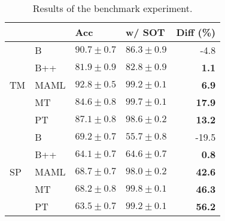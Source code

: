 \begin{table}[h]
\caption{Results of the benchmark experiment.}
\label{tab:tuned-benchmark}
\centering
\begin{tabular}{llllr}
\toprule
 &  & Acc & w/ SOT & Diff (\%) \\
\midrule
\multirow[c]{5}{*}{TM} & B & $90.7 \pm 0.7$ & $86.3 \pm 0.9$ & -4.8 \\
 & B++ & $81.9 \pm 0.9$ & $82.8 \pm 0.9$ & \bfseries 1.1 \\
 & MAML & $92.8 \pm 0.5$ & $99.2 \pm 0.1$ & \bfseries 6.9 \\
 & MT & $84.6 \pm 0.8$ & $99.7 \pm 0.1$ & \bfseries 17.9 \\
 & PT & $87.1 \pm 0.8$ & $98.6 \pm 0.2$ & \bfseries 13.2 \\
\midrule
\multirow[c]{5}{*}{SP} & B & $69.2 \pm 0.7$ & $55.7 \pm 0.8$ & -19.5 \\
 & B++ & $64.1 \pm 0.7$ & $64.6 \pm 0.7$ & \bfseries 0.8 \\
 & MAML & $68.7 \pm 0.7$ & $98.0 \pm 0.2$ & \bfseries 42.6 \\
 & MT & $68.2 \pm 0.8$ & $99.8 \pm 0.1$ & \bfseries 46.3 \\
 & PT & $63.5 \pm 0.7$ & $99.2 \pm 0.1$ & \bfseries 56.2 \\
\bottomrule
\end{tabular}
\end{table}